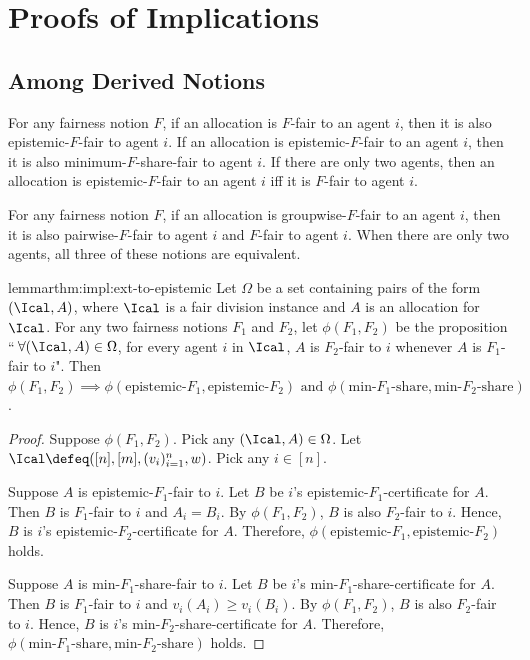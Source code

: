 \section{Proofs of Implications}
\label{sec:impls-extra}

\subsection{Among Derived Notions}
\label{sec:impls-extra:among-derived}

\begin{remark}
\label{thm:impl:epistemic}
For any fairness notion $F$, if an allocation is $F$-fair to an agent $i$,
then it is also epistemic-$F$-fair to agent $i$.
If an allocation is epistemic-$F$-fair to an agent $i$,
then it is also minimum-$F$-share-fair to agent $i$.
If there are only two agents, then an allocation is epistemic-$F$-fair to an agent $i$
iff it is $F$-fair to agent $i$.
\end{remark}

\begin{remark}
\label{thm:impl:groupwise}
For any fairness notion $F$, if an allocation is groupwise-$F$-fair to an agent $i$,
then it is also pairwise-$F$-fair to agent $i$ and $F$-fair to agent $i$.
When there are only two agents, all three of these notions are equivalent.
\end{remark}

\begin{restatable}{lemma}{rthm:impl:ext-to-epistemic}
\label{thm:impl:ext-to-epistemic}
Let $\Omega$ be a set containing pairs of the form $(\Ical, A)$,
where $\Ical$ is a fair division instance and $A$ is an allocation for $\Ical$.
For any two fairness notions $F_1$ and $F_2$, let $\phi(F_1, F_2)$ be the proposition
``\,$\forall (\Ical, A) \in \Omega$, for every agent $i$ in $\Ical$,
$A$ is $F_2$-fair to $i$ whenever $A$ is $F_1$-fair to $i$". Then
$\phi(F_1, F_2) \implies \phi(\textrm{epistemic-}F_1, \textrm{epistemic-}F_2)
\textrm{ and } \phi(\textrm{min-}F_1\textrm{-share}, \textrm{min-}F_2\textrm{-share})$.
\end{restatable}
\begin{proof}
Suppose $\phi(F_1, F_2)$.
Pick any $(\Ical, A) \in \Omega$.
Let $\Ical \defeq ([n], [m], (v_i)_{i=1}^n, w)$.
Pick any $i \in [n]$.

Suppose $A$ is epistemic-$F_1$-fair to $i$.
Let $B$ be $i$'s epistemic-$F_1$-certificate for $A$.
Then $B$ is $F_1$-fair to $i$ and $A_i = B_i$.
By $\phi(F_1, F_2)$, $B$ is also $F_2$-fair to $i$.
Hence, $B$ is $i$'s epistemic-$F_2$-certificate for $A$.
Therefore, $\phi(\textrm{epistemic-}F_1, \textrm{epistemic-}F_2)$ holds.

Suppose $A$ is min-$F_1$-share-fair to $i$.
Let $B$ be $i$'s min-$F_1$-share-certificate for $A$.
Then $B$ is $F_1$-fair to $i$ and $v_i(A_i) \ge v_i(B_i)$.
By $\phi(F_1, F_2)$, $B$ is also $F_2$-fair to $i$.
Hence, $B$ is $i$'s min-$F_2$-share-certificate for $A$.
Therefore, $\phi(\textrm{min-}F_1\textrm{-share}, \textrm{min-}F_2\textrm{-share})$ holds.
\end{proof}

